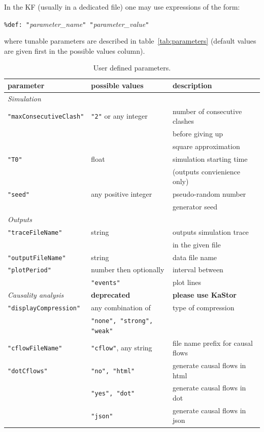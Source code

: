 \documentclass[11pt]{book}
\def\ttt#1{\texttt{#1}}
\begin{document}
In the KF (usually in a dedicated file) one may use expressions of the form:

\hfill\hbox{\ttt{\%def: "}\textit{parameter\_name}\ttt{" "}\textit{parameter\_value}\ttt{"}}\hfill\null

where tunable parameters are described in table~\ref{tab:parameters} (default values are given first in the possible values column).
\begin{table}[ht]
\caption{User defined parameters.}
\begin{tabular}{l|l|l}
parameter & possible values & description \\
\hline
\textit{Simulation} & &\\
\ttt{"maxConsecutiveClash"} & \ttt{"2"} or any integer & \small number of consecutive clashes \\
&& \small before giving up \\
&& \small square approximation\\
\ttt{"T0"} & float & \small simulation starting time\\
&& \small (outputs convienience only)\\
\ttt{"seed"} & any positive integer & \small pseudo-random number\\
&& \small generator seed\\ \hline
\textit{Outputs}&&\\
\ttt{"traceFileName"} & string & \small outputs simulation trace\\
&&\small in the given file\\
\ttt{"outputFileName"} & string & \small data file name\\
\ttt{"plotPeriod"} & number then optionally& \small interval between\\
& \ttt{"events"} & plot lines\\
\textit{Causality analysis}&\textbf{deprecated}&\textbf{please use KaStor}\\
\ttt{"displayCompression"} & any combination of & \small type of compression \\
&  \ttt{"none", "strong", "weak"} & \\
\ttt{"cflowFileName"} & \ttt{"cflow"}, any string & \small file name prefix for causal flows\\
\ttt{"dotCflows"} & \ttt{"no", "html"} & \small generate causal flows in html \\
& \ttt{"yes", "dot"} & \small generate causal flows in dot \\
& \ttt{"json"} & \small generate causal flows in json\\ \hline

\end{tabular}
\end{table}
\end{document}
